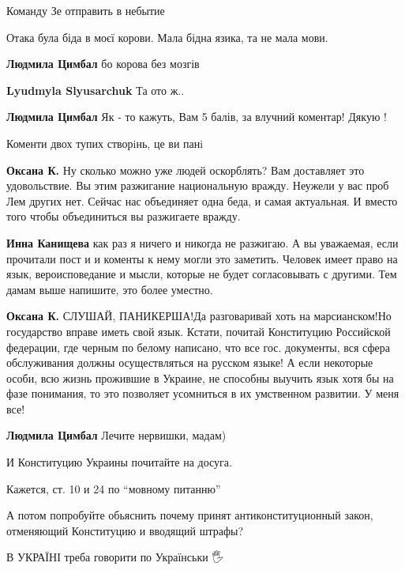 \begin{itemize}
Команду Зе отправить в небытие

Отака була біда в моєї корови. Мала бідна язика, та не мала мови.

\begin{itemize}

\textbf{Людмила Цимбал} бо корова без мозгів

\textbf{Lyudmyla Slyusarchuk} Та ото ж..

\textbf{Людмила Цимбал} Як - то кажуть, Вам 5 балів, за влучний коментар! Дякую !

Коменти двох тупих створiнь, це ви панi

\textbf{Оксана К.} Ну сколько можно уже людей оскорблять? Вам доставляет это
удовольствие. Вы этим разжигание национальную вражду. Неужели у вас проб Лем
других нет. Сейчас нас объединяет одна беда, и самая актуальная. И вместо того
чтобы объединиться вы разжигаете вражду.

\textbf{Инна Канищева} как раз я ничего и никогда не разжигаю. А вы уважаемая,
если прочитали пост и и коменты к нему могли это заметить. Человек имеет право
на язык, вероисповедание и мысли, которые не будет согласовывать с другими. Тем
дамам выше напишите, это более уместно.

\textbf{Оксана К.} СЛУШАЙ, ПАНИКЕРША!Да разговаривай хоть на марсианском!Но
государство вправе иметь свой язык. Кстати, почитай Конституцию Российской
федерации, где черным по белому написано, что все гос. документы, вся сфера
обслуживания должны осуществляться на русском языке! А если некоторые особи,
всю жизнь прожившие в Украине, не способны выучить язык хотя бы на фазе
понимания, то это позволяет усомниться в их умственном развитии. У меня все!

\textbf{Людмила Цимбал} Лечите нервишки, мадам)

И Конституцию Украины почитайте на досуга.

Кажется, ст. 10 и 24 по \enquote{мовному питанню}

А потом попробуйте обьяснить почему принят антиконституционный закон,
отменяющий Конституцию и вводящий штрафы?

\end{itemize}


В УКРАЇНІ треба говорити по Українськи 🖐️


\end{itemize}

